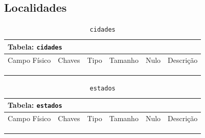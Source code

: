 \documentclass[12pt,a4paper]{article}
\begin{document}
\subsection{Localidades}


\begin{center}
\begin{table}[h!]
	\caption{\texttt{cidades}}
	\label{tabela:cidades}
	\begin{tabular}{|p{2.5cm}|p{1cm}|p{1.25cm}|p{1.75cm}|p{1.25cm}|p{5cm}|}\hline	
		\multicolumn{6}{|p{16cm}|}{\cellcolor{cinzaClaro}  \centering Tabela: \texttt{cidades}} \\ \hline %
		{\small Campo Físico}   & {\small Chaves} & {\small Tipo} & {\small Tamanho} & {\small Nulo} & {\small Descrição}\\\hline %
		
		{\tiny } & {\tiny } & {\tiny } & {\tiny } & {\tiny } &{\tiny }\\\hline
		{\tiny } & {\tiny } & {\tiny } & {\tiny } & {\tiny } &{\tiny }\\\hline
		{\tiny } & {\tiny } & {\tiny } & {\tiny } & {\tiny } &{\tiny }\\\hline
		
			
	\end{tabular}
\end{table}	
\end{center}

\begin{center}
\begin{table}[h!]
	\caption{\texttt{estados}}
	\label{tabela:estados}
	\begin{tabular}{|p{2.5cm}|p{1cm}|p{1.25cm}|p{1.75cm}|p{1.25cm}|p{5cm}|}\hline	
		\multicolumn{6}{|p{16cm}|}{\cellcolor{cinzaClaro}  \centering Tabela: \texttt{estados}} \\ \hline %
		{\small Campo Físico}   & {\small Chaves} & {\small Tipo} & {\small Tamanho} & {\small Nulo} & {\small Descrição}\\\hline %
		
		{\tiny } & {\tiny } & {\tiny } & {\tiny } & {\tiny } &{\tiny }\\\hline
		{\tiny } & {\tiny } & {\tiny } & {\tiny } & {\tiny } &{\tiny }\\\hline
		{\tiny } & {\tiny } & {\tiny } & {\tiny } & {\tiny } &{\tiny }\\\hline
			
	\end{tabular}
\end{table}	
\end{center}
\end{document}
